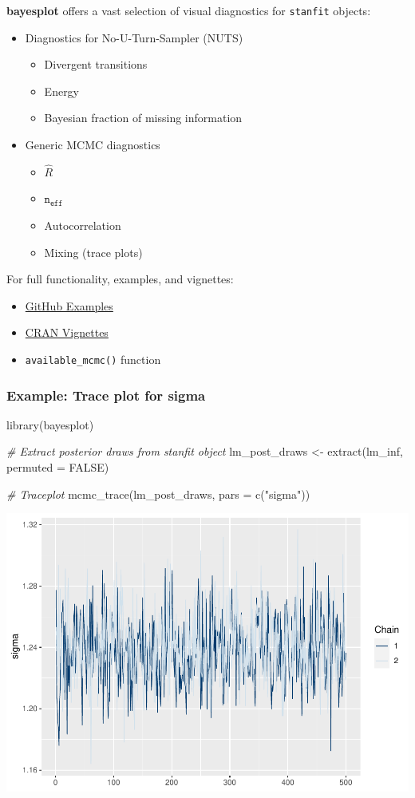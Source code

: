 \documentclass[
  11pt,
]{article}
\newenvironment{Shaded}{\begin{snugshade}}{\end{snugshade}}
\newcommand{\AttributeTok}[1]{\textcolor[rgb]{0.77,0.63,0.00}{#1}}
\newcommand{\CommentTok}[1]{\textcolor[rgb]{0.56,0.35,0.01}{\textit{#1}}}
\newcommand{\ConstantTok}[1]{\textcolor[rgb]{0.00,0.00,0.00}{#1}}
\newcommand{\FunctionTok}[1]{\textcolor[rgb]{0.00,0.00,0.00}{#1}}
\newcommand{\NormalTok}[1]{#1}
\newcommand{\OtherTok}[1]{\textcolor[rgb]{0.56,0.35,0.01}{#1}}
\newcommand{\StringTok}[1]{\textcolor[rgb]{0.31,0.60,0.02}{#1}}
\providecommand{\tightlist}{%
  \setlength{\itemsep}{0pt}\setlength{\parskip}{0pt}}
\begin{document}
\textbf{bayesplot} offers a vast selection of visual diagnostics for \texttt{stanfit} objects:

\begin{itemize}
\tightlist
\item
  Diagnostics for No-U-Turn-Sampler (NUTS)

  \begin{itemize}
  \tightlist
  \item
    Divergent transitions
  \item
    Energy
  \item
    Bayesian fraction of missing information
  \end{itemize}
\item
  Generic MCMC diagnostics

  \begin{itemize}
  \tightlist
  \item
    \(\hat{R}\)
  \item
    \(\mathtt{n_{eff}}\)
  \item
    Autocorrelation
  \item
    Mixing (trace plots)
  \end{itemize}
\end{itemize}

For full functionality, examples, and vignettes:

\begin{itemize}
\tightlist
\item
  \href{https://github.com/stan-dev/bayesplot}{GitHub Examples}
\item
  \href{https://cran.r-project.org/web/packages/bayesplot/vignettes/visual-mcmc-diagnostics.html}{CRAN Vignettes}
\item
  \texttt{available\_mcmc()} function
\end{itemize}

\hypertarget{example-trace-plot-for-sigma}{%
\subsubsection{Example: Trace plot for sigma}\label{example-trace-plot-for-sigma}}

\begin{Shaded}
\begin{Highlighting}[]
\FunctionTok{library}\NormalTok{(bayesplot)}

\CommentTok{\# Extract posterior draws from stanfit object}
\NormalTok{lm\_post\_draws }\OtherTok{\textless{}{-}} \FunctionTok{extract}\NormalTok{(lm\_inf, }\AttributeTok{permuted =} \ConstantTok{FALSE}\NormalTok{)}

\CommentTok{\# Traceplot}
\FunctionTok{mcmc\_trace}\NormalTok{(lm\_post\_draws, }\AttributeTok{pars =} \FunctionTok{c}\NormalTok{(}\StringTok{"sigma"}\NormalTok{))}
\end{Highlighting}
\end{Shaded}

\begin{center}\includegraphics[width=0.5\linewidth]{04-lec_files/figure-latex/bayesplot-1} \end{center}
\end{document}
